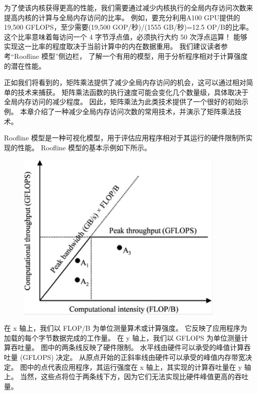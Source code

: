 为了使该内核获得更高的性能，我们需要通过减少内核执行的全局内存访问次数来提高内核的计算与全局内存访问的比率。 
例如，要充分利用A100 GPU提供的19,500 GFLOPS，至少需要(19,500 GOP/秒)/(1555 GB/秒)=12.5 OP/B的比率。 
这个比率意味着每访问一个 4 字节浮点值，必须执行大约 50 次浮点运算！ 
能够实现这一比率的程度取决于当前计算中的内在数据重用。 我们建议读者参考“Roofline 模型”侧边栏，
了解一个有用的模型，用于分析程序相对于计算强度的潜在性能。

正如我们将看到的，矩阵乘法提供了减少全局内存访问的机会，这可以通过相对简单的技术来捕获。 
矩阵乘法函数的执行速度可能会变化几个数量级，具体取决于全局内存访问的减少程度。 
因此，矩阵乘法为此类技术提供了一个很好的初始示例。 本章介绍了一种减少全局内存访问次数的常用技术，并演示了矩阵乘法技术。

\begin{remark}[Roofline 模型]
Roofline 模型是一种可视化模型，用于评估应用程序相对于其运行的硬件限制所实现的性能。 
Roofline 模型的基本示例如下所示。

\begin{figure}[H]
	\centering
	\includegraphics[width=0.9\textwidth]{figs/F5-a.1.png}
\end{figure}

在 x 轴上，我们以 FLOP/B 为单位测量算术或计算强度。 它反映了应用程序为加载的每个字节数据完成的工作量。 
在 y 轴上，我们以 GFLOPS 为单位测量计算吞吐量。 图中的两条线反映了硬件限制。 
水平线由硬件可以承受的峰值计算吞吐量 (GFLOPS) 决定。 从原点开始的正斜率线由硬件可以承受的峰值内存带宽决定。 
图中的点代表应用程序，其运行强度在 x 轴上，其实现的计算吞吐量在 y 轴上。 
当然，这些点将位于两条线下方，因为它们无法实现比硬件峰值更高的吞吐量。


\end{remark}
